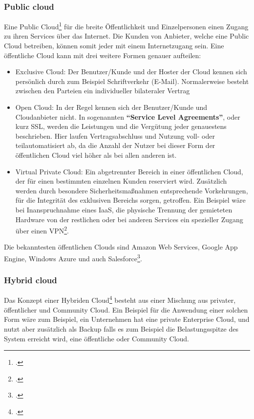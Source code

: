 \subsubsection{Public cloud}
Eine Public Cloud\footcite{cloud-ms-ph} für die breite Öffentlichkeit und Einzelpersonen einen Zugang zu ihren Services über das Internet. Die Kunden von Anbieter, welche eine Public Cloud betreiben, können somit jeder mit einem Internetzugang sein. Eine öffentliche Cloud kann mit drei weitere Formen genauer aufteilen:
\begin{itemize}
	\item Exclusive Cloud: Der Benutzer/Kunde und der Hoster der Cloud kennen sich persönlich durch zum Beispiel Schriftverkehr (E-Mail). Normalerweise besteht zwischen den Parteien ein individueller bilateraler Vertrag
	\item Open Cloud: In der Regel kennen sich der Benutzer/Kunde und Cloudanbieter nicht. In sogenannten \textbf{"`Service Level Agreements"'}, oder kurz SSL, werden die Leistungen und die Vergütung jeder genauestens beschrieben. Hier laufen Vertragsabschluss und Nutzung voll- oder teilautomatisiert ab, da die Anzahl der Nutzer bei dieser Form der öffentlichen Cloud viel höher als bei allen anderen ist.
	\item Virtual Private Cloud: Ein abgetrennter Bereich in einer öffentlichen Cloud, der für einen bestimmten einzelnen Kunden reserviert wird. Zusätzlich werden durch besondere Sicherheitsmaßnahmen entsprechende Vorkehrungen, für die Integrität des exklusiven Bereichs sorgen, getroffen. Ein Beispiel wäre bei Inanspruchnahme eines IaaS, die physische Trennung der gemieteten Hardware von der restlichen oder bei anderen Services ein spezieller Zugang über einen VPN\footcite{Lehrunterlagen-HTL-cloud}.
\end{itemize}
Die bekanntesten öffentlichen Clouds sind Amazon Web Services, Google App Engine, Windows Azure und auch Salesforce\footcite{cloud-computing}.

\subsubsection{Hybrid cloud}
Das Konzept einer Hybriden Cloud\footcite{cloud-ms-ph} besteht aus einer Mischung aus privater, öffentlicher und Community Cloud. Ein Beispiel für die Anwendung einer solchen Form wäre zum Beispiel, ein Unternehmen hat eine private Enterprise Cloud, und nutzt aber zusätzlich als Backup falls es zum Beispiel die Belastungsspitze des System erreicht wird, eine öffentliche oder Community Cloud.

